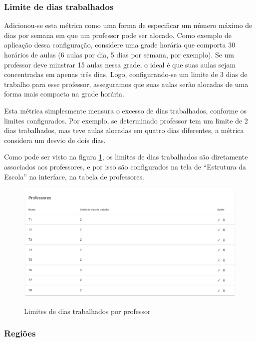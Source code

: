 \subsubsection{Limite de dias trabalhados}

Adicionou-se esta métrica como uma forma de especificar um número máximo de dias por semana em que um professor pode ser alocado. Como exemplo de aplicação dessa configuração, considere uma grade horária que comporta 30 horários de aulas (6 aulas por dia, 5 dias por semana, por exemplo). Se um professor deve minstrar 15 aulas nessa grade, o ideal é que suas aulas sejam concentradas em apenas três dias. Logo, configurando-se um limite de 3 dias de trabalho para esse professor, asseguramos que suas aulas serão alocadas de uma forma mais compacta na grade horária.

Esta métrica simplesmente mensura o excesso de dias trabalhados, conforme os limites configurados. Por exemplo, se determinado professor tem um limite de 2 dias trabalhados, mas teve aulas alocadas em quatro dias diferentes, a métrica considera um desvio de dois dias.

Como pode ser visto na figura \ref{fig:limites_dias}, os limites de dias trabalhados são diretamente associados aos professores, e por isso são configurados na tela de ``Estrutura da Escola'' na interface, na tabela de professores.

\begin{figure}[h]
	\centering
	\caption{Limites de dias trabalhados por professor}
	\includegraphics[width=1\textwidth]{./dados/figuras/limite_dias}
	\label{fig:limites_dias}
\end{figure}

\subsubsection{Regiões}

